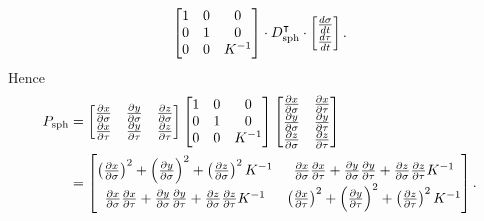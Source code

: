 \documentclass{ximera}
\begin{document}
\begin{problem}
\begin{freeResponse}
\begin{align*}
    \begin{bmatrix}
      1 & 0 & 0\\
      0 & 1 & 0\\
    0 & 0 & K^{-1}
    \end{bmatrix}
    \cdot
    D_{\mathrm{sph}}^\transpose
    \cdot \begin{bmatrix}
      \frac{d\sigma}{dt} \\ \frac{d\tau}{dt}
    \end{bmatrix}.
  \end{align*}
    Hence
    \begin{align*}
      P_\mathrm{sph} &=
      \begin{bmatrix}
        \pp[x]{\sigma} & \pp[y]{\sigma} & \pp[z]{\sigma} \\
        \pp[x]{\tau} & \pp[y]{\tau} & \pp[z]{\tau}
      \end{bmatrix}
      \begin{bmatrix}
        1 & 0 & 0\\
        0 & 1 & 0\\
        0 & 0 & K^{-1}
      \end{bmatrix}
      \begin{bmatrix}
        \pp[x]{\sigma} & \pp[x]{\tau}\\ 
        \pp[y]{\sigma} & \pp[y]{\tau}\\
        \pp[z]{\sigma} & \pp[z]{\tau}
      \end{bmatrix}\\
      &=
      \begin{bmatrix}
        \left(\pp[x]{\sigma}\right)^2 + \left(\pp[y]{\sigma}\right)^2 + \left(\pp[z]{\sigma}\right)^2K^{-1} & \pp[x]{\sigma}\pp[x]{\tau} + \pp[y]{\sigma}\pp[y]{\tau} + \pp[z]{\sigma}\pp[z]{\tau} K^{-1}\\
        \pp[x]{\sigma}\pp[x]{\tau} + \pp[y]{\sigma}\pp[y]{\tau} + \pp[z]{\sigma}\pp[z]{\tau} K^{-1}       & \left(\pp[x]{\tau}\right)^2 + \left(\pp[y]{\tau}\right)^2 + \left(\pp[z]{\tau}\right)^2K^{-1}
      \end{bmatrix}.
    \end{align*}
  \end{freeResponse}
\end{problem}
\end{document}
